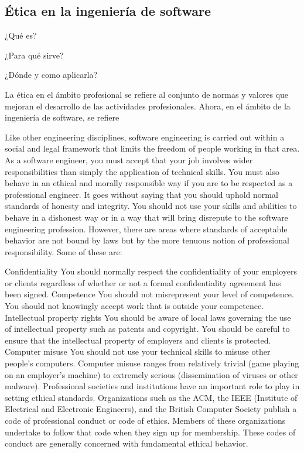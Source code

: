 \documentclass[12pt]{article}
\begin{document}
\begin{multicols}{2}
    
\section{Ética en la ingeniería de software}

¿Qué es?

¿Para qué sirve?

¿Dónde y como aplicarla?

La ética en el ámbito profesional se refiere al conjunto de normas y valores que
mejoran el desarrollo de las actividades profesionales. Ahora, en el ámbito de
la ingeniería de software, se refiere 

Like other engineering disciplines, software engineering is carried out within a
social and legal framework that limits the freedom of people working in that
area. As a software engineer, you must accept that your job involves wider
responsibilities than simply the application of technical skills. You must also
behave in an ethical and morally responsible way if you are to be respected as a
professional engineer. It goes without saying that you should uphold normal
standards of honesty and integrity. You should not use your skills and abilities
to behave in a dishonest way or in a way that will bring disrepute to the
software engineering profession. However, there are areas where standards of
acceptable behavior are not bound by laws but by the more tenuous notion of
professional responsibility. Some of these are:

Confidentiality You should normally respect the confidentiality of your
employers or clients regardless of whether or not a formal confidentiality
agreement has been signed. Competence You should not misrepresent your level of
competence. You should not knowingly accept work that is outside your
competence. Intellectual property rights You should be aware of local laws
governing the use of intellectual property such as patents and copyright. You
should be careful to ensure that the intellectual property of employers and
clients is protected. Computer misuse You should not use your technical skills
to misuse other people's computers. Computer misuse ranges from relatively
trivial (game playing on an employer's machine) to extremely serious
(dissemination of viruses or other malware). Professional societies and
institutions have an important role to play in setting ethical standards.
Organizations such as the ACM, the IEEE (Institute of Electrical and Electronic
Engineers), and the British Computer Society publish a code of professional
conduct or code of ethics. Members of these organizations undertake to follow
that code when they sign up for membership. These codes of conduct are generally
concerned with fundamental ethical behavior.

\end{multicols}
\end{document}

